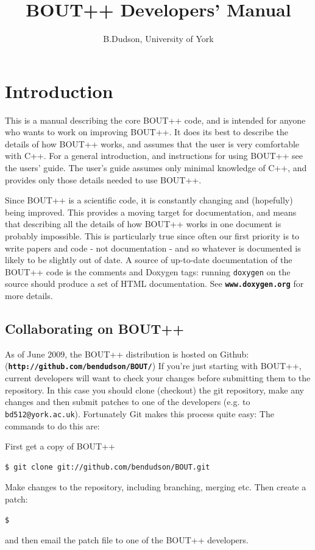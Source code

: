 \documentclass[12pt]{article}
\newcommand{\code}[1]{\texttt{#1}}
\newcommand{\file}[1]{\texttt{\bf #1}}
\begin{document}
\title{BOUT++ Developers' Manual}
\author{B.Dudson, University of York}

\maketitle

\tableofcontents

\section{Introduction}

This is a manual describing the core BOUT++ code, and is intended for anyone who
wants to work on improving BOUT++. It does its best to describe
the details of how BOUT++ works, and assumes that the user is very comfortable
with C++. For a general introduction, and instructions for using BOUT++
see the users' guide. The user's guide assumes only minimal knowledge of C++,
and provides only those details needed to use BOUT++. 

Since BOUT++ is a scientific code, it is constantly changing and (hopefully)
being improved. This provides a moving target for documentation, and means
that describing all the details of how BOUT++ works in one document is probably
impossible. This is particularly true since often our first priority is to
write papers and code - not documentation - and so whatever is documented
is likely to be slightly out of date. A source of up-to-date documentation
of the BOUT++ code is the comments and Doxygen tags: running \code{doxygen}
on the source should produce a set of HTML documentation. See
\file{www.doxygen.org} for more details.

\subsection{Collaborating on BOUT++}

As of June 2009, the BOUT++ distribution is hosted on Github:
(\file{http://github.com/bendudson/BOUT/})
If you're just starting with BOUT++, current developers will want to check
your changes before submitting them to the repository. In this case
you should clone (checkout) the git repository, make any changes and
then submit patches to one of the developers (e.g.
to \texttt{bd512@york.ac.uk}). Fortunately Git makes this process quite easy:
The commands to do this are:

First get a copy of BOUT++
\begin{verbatim}
$ git clone git://github.com/bendudson/BOUT.git
\end{verbatim}
Make changes to the repository, including branching, merging etc. Then create
a patch:
\begin{verbatim}
$ 
\end{verbatim}
and then email the patch file to one of the BOUT++ developers. 
\end{document}
